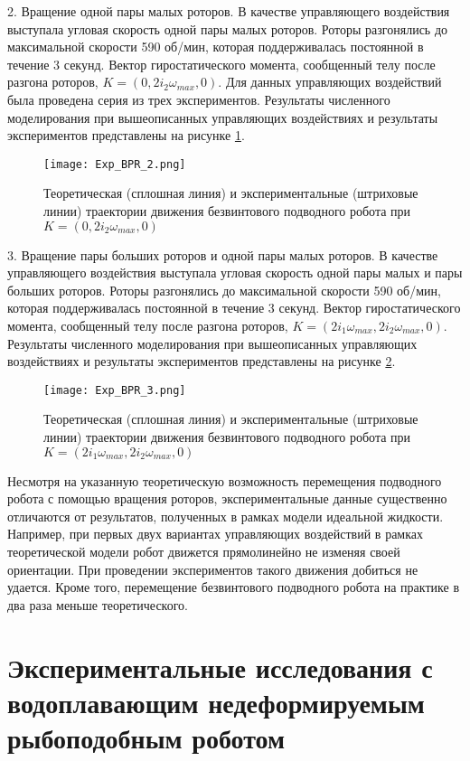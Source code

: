 2.	Вращение одной пары малых роторов. В качестве управляющего воздействия выступала угловая скорость одной пары малых роторов. Роторы разгонялись до максимальной скорости 590 об/мин, которая поддерживалась постоянной в течение 3 секунд. Вектор гиростатического момента, сообщенный телу после разгона роторов, $K = (0, 2i_2\omega_{max}, 0)$. Для данных управляющих воздействий была проведена серия из трех экспериментов. Результаты численного моделирования при вышеописанных управляющих воздействиях и результаты экспериментов представлены на рисунке \ref{Exp_BPR_2}.

\begin{figure}[ht]
	\centering
	\texttt{[image: Exp\_BPR\_2.png]}%
	\caption{Теоретическая (сплошная линия) и экспериментальные (штриховые линии) траектории движения безвинтового подводного робота при $K = (0, 2i_2\omega_{max}, 0)$}
	\label{Exp_BPR_2}
\end{figure}


3.	Вращение пары больших роторов и одной пары малых роторов. В качестве управляющего воздействия выступала угловая скорость одной пары малых и пары больших роторов. Роторы разгонялись до максимальной скорости 590 об/мин, которая поддерживалась постоянной в течение 3 секунд. Вектор гиростатического момента, сообщенный телу после разгона роторов, $K = (2i_1\omega_{max}, 2i_2\omega_{max}, 0)$. Результаты численного моделирования при вышеописанных управляющих воздействиях и результаты экспериментов представлены на рисунке \ref{Exp_BPR_3}.

\begin{figure}[ht]
	\centering
	\texttt{[image: Exp\_BPR\_3.png]}%
	\caption{Теоретическая (сплошная линия) и экспериментальные (штриховые линии) траектории движения безвинтового подводного робота при $K = (2i_1\omega_{max}, 2i_2\omega_{max}, 0)$}
	\label{Exp_BPR_3}
\end{figure}

Несмотря на указанную теоретическую возможность перемещения подводного робота с помощью вращения роторов, экспериментальные данные существенно отличаются от результатов, полученных в рамках модели идеальной жидкости. Например, при первых двух вариантах управляющих воздействий в рамках теоретической модели робот движется прямолинейно не изменяя своей ориентации. При проведении экспериментов такого движения добиться не удается. Кроме того, перемещение безвинтового подводного робота на практике в два раза меньше теоретического.


\section{Экспериментальные исследования с водоплавающим недеформируемым рыбоподобным роботом}\label{sec:ch4/sec3}
	
	
\clearpage